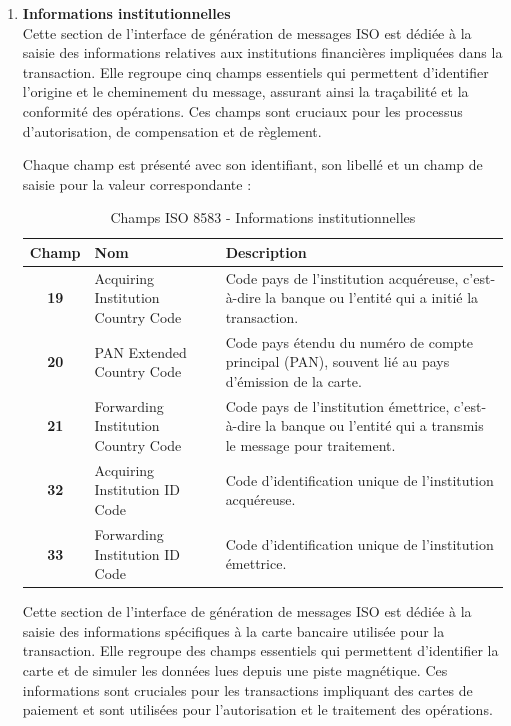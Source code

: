 \begin{enumerate}[label=\alph*)]
\item \textbf{ Informations institutionnelles} \\

Cette section de l'interface de génération de messages ISO est dédiée à la saisie des informations relatives aux institutions financières impliquées dans la transaction. Elle regroupe cinq champs essentiels qui permettent d'identifier l'origine et le cheminement du message, assurant ainsi la traçabilité et la conformité des opérations. Ces champs sont cruciaux pour les processus d'autorisation, de compensation et de règlement.

Chaque champ est présenté avec son identifiant, son libellé et un champ de saisie pour la valeur correspondante :

\begin{table}[H]
\centering
{}
\renewcommand{\arraystretch}{1.5}
\begin{tabular}{|>{\bfseries}c|m{4cm}|m{7cm}|}
\hline
\rowcolor{blue!20}
\textbf{Champ} & \textbf{Nom} & \textbf{Description} \\
\hline
19 & Acquiring Institution Country Code & Code pays de l'institution acquéreuse, c'est-à-dire la banque ou l'entité qui a initié la transaction. \\
\hline
20 & PAN Extended Country Code & Code pays étendu du numéro de compte principal (PAN), souvent lié au pays d'émission de la carte. \\
\hline
21 & Forwarding Institution Country Code & Code pays de l'institution émettrice, c'est-à-dire la banque ou l'entité qui a transmis le message pour traitement. \\
\hline
32 & Acquiring Institution ID Code & Code d'identification unique de l'institution acquéreuse. \\
\hline
33 & Forwarding Institution ID Code & Code d'identification unique de l'institution émettrice. \\
\hline
\end{tabular}
\caption{Champs ISO 8583 - Informations institutionnelles}
\label{tab:iso-institution-fields}
\end{table}

Cette section de l'interface de génération de messages ISO est dédiée à la saisie des informations spécifiques à la carte bancaire utilisée pour la transaction. Elle regroupe des champs essentiels qui permettent d'identifier la carte et de simuler les données lues depuis une piste magnétique. Ces informations sont cruciales pour les transactions impliquant des cartes de paiement et sont utilisées pour l'autorisation et le traitement des opérations.


\end{enumerate}
